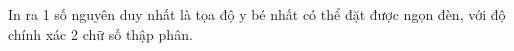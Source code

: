 In ra 1 số nguyên duy nhất là tọa độ y bé nhất có thể đặt được ngọn đèn, với độ chính xác 2 chữ số thập phân.

\